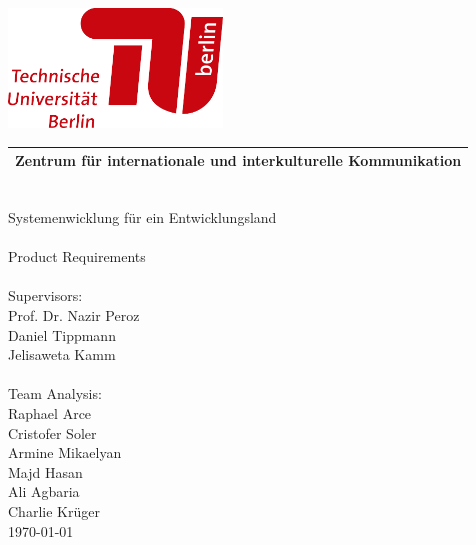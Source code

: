 \documentclass[12pt, a4paper, headinclude, footinclude, plainfootsepline]{scrreprt}
\begin{document}
\pagecolor{darkblue}

\hspace*{2cm}\includegraphics[width=57mm]{../Pictures/TULogo}

\begin{tabularx}{\textwidth}{C}
\\
\hline
\color{skyblue} Zentrum für internationale und interkulturelle Kommunikation\\
\hline
\end{tabularx}
\vspace*{5cm}\\
\hspace*{3cm}\color{skyblue}\Huge Systemenwicklung für ein Entwicklungsland 
\\
\vspace*{0,7cm}\\
\hspace*{3cm}\Large Product Requirements
\\
\vspace*{4cm}\\
\hspace*{3cm}\Large Supervisors:
\\
{\normalsize
	\hspace*{3.5cm}Prof. Dr. Nazir Peroz\\
	\hspace*{3.5cm}Daniel Tippmann\\
	\hspace*{3.5cm}Jelisaweta Kamm\\
}
\vspace*{0.5cm}\\
\hspace*{3cm}\Large Team Analysis:\\
{\normalsize
	\hspace*{3.5cm}Raphael Arce\\
	\hspace*{3.5cm}Cristofer Soler\\
	\hspace*{3.5cm}Armine Mikaelyan\\
	\hspace*{3.5cm}Majd Hasan\\
	\hspace*{3.5cm}Ali Agbaria\\
	\hspace*{3.5cm}Charlie Krüger\\
}
\hspace*{14cm}\large \today
\end{document}
